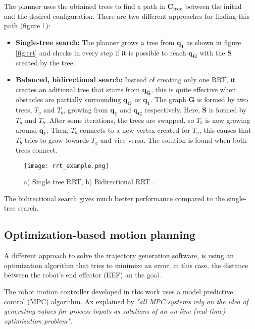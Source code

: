 The planner uses the obtained trees to find a path in $\bm{C_{free}}$ between the initial and the desired configuration. There are two different approaches for finding this path (figure \ref{fig:rrt_ex}):
\begin{itemize}
	\item \textbf{Single-tree search:} The planner grows a tree from $\bm{q_1}$ as shown in figure \ref{fig:rrt} and checks in every step if it is possible to reach $\bm{q_G}$ with the $\bm{S}$ created by the tree.
	\item \textbf{Balanced, bidirectional search:} Instead of creating only one RRT, it creates an aditional tree that starts from $\bm{q_G}$, this is quite effective when obstacles are partially surrounding $\bm{q_G}$ or $\bm{q_1}$. The graph $\bm{G}$ is formed by two trees, $T_a$ and $T_b$, growing from $\bm{q_1}$ and $\bm{q_G}$ respectively. Here, $\bm{S}$ is formed by $T_a$ and $T_b$. After some iterations, the trees are swapped, so $T_b$ is now growing around $\bm{q_1}$. Then, $T_b$ connects to a new vertex created for $T_a$, this causes that $T_b$ tries to grow towards $T_a$ and vice-versa. The solution is found when both trees connect.
\end{itemize}

\begin{figure}[H]
	\centering
	\texttt{[image: rrt\_example.png]}
	\vspace{-10pt}
	\caption{ a) Single tree RRT, b) Bidirectional RRT \citep[chap.5, page 219]{planning}.}
	\vspace{-15pt}
	\label{fig:rrt_ex}
\end{figure}

The bidirectional search gives much better performance compared to the single-tree search.

\subsection{Optimization-based motion planning}
\label{sub:optimization}
A different approach to solve the trajectory generation software, is using an optimization algorithm that tries to minimize an error, in this case, the distance between the robot's end effector (EEF) an the goal.
 
The robot motion controller developed in this work uses a model predictive control (MPC) algorithm. Ax explained by \citet{mpc} \textit{"all MPC	systems rely on the idea of generating values for process inputs as solutions of an on-line (real-time) optimization problem"}. 

